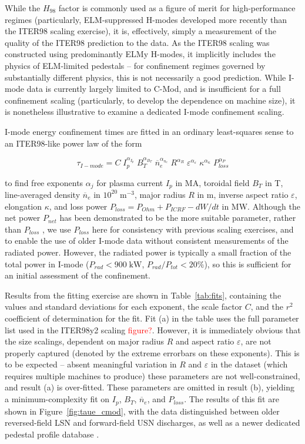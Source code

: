 \documentclass[12pt]{iopart}
\renewcommand{\note}[1]{\textcolor{red}{#1}}
\begin{document}
While the $H_{98}$ factor is commonly used as a figure of merit for high-performance regimes (particularly, ELM-suppressed H-modes developed more recently than the ITER98 scaling exercise), it is, effectively, simply a measurement of the quality of the ITER98 prediction to the data.
As the ITER98 scaling was constructed using predominantly ELMy H-modes, it implicitly includes the physics of ELM-limited pedestals -- for confinement regimes governed by substantially different physics, this is not necessarily a good prediction.
While I-mode data is currently largely limited to C-Mod, and is insufficient for a full confinement scaling (particularly, to develop the dependence on machine size), it is nonetheless illustrative to examine a dedicated I-mode confinement scaling.

I-mode energy confinement times are fitted in an ordinary least-squares sense to an ITER98-like power law of the form

\begin{equation}
 \tau_{I-mode} = C \; I_p^{\alpha_{I_p}} \; B_T^{\alpha_{B_T}} \; \overline{n}_e^{\alpha_{n_e}} \; R^{\alpha_R} \; \varepsilon^{\alpha_\varepsilon} \; \kappa^{\alpha_\kappa} \; P_{loss}^{\alpha_P}
\end{equation}

\noindent to find free exponents $\alpha_j$ for plasma current $I_p$ in MA, toroidal field $B_T$ in T, line-averaged density $\overline{n}_e$ in $10^{20}\;\mbox{m}^{-3}$, major radius $R$ in m, inverse aspect ratio $\varepsilon$, elongation $\kappa$, and loss power $P_{loss} = P_{Ohm} + P_{ICRF} - dW/dt$ in MW.
Although the net power $P_{net}$ has been demonstrated to be the more suitable parameter, rather than $P_{loss}$ \cite{Hughes2002}, we use $P_{loss}$ here for consistency with previous scaling exercises, and to enable the use of older I-mode data without consistent measurements of the radiated power.
However, the radiated power is typically a small fraction of the total power in I-mode ($P_{rad} < 900\;\mbox{kW}$, $P_{rad}/P_{tot} < 20\%$), so this is sufficient for an initial assessment of the confinement.

Results from the fitting exercise are shown in Table~\ref{tab:fits}, containing the values and standard deviations for each exponent, the scale factor $C$, and the $r^2$ coefficient of determination for the fit.
Fit (a) in the table uses the full parameter list used in the ITER98y2 scaling \note{figure?}.
However, it is immediately obvious that the size scalings, dependent on major radius $R$ and aspect ratio $\varepsilon$, are not properly captured (denoted by the extreme errorbars on these exponents).
This is to be expected -- absent meaningful variation in $R$ and $\varepsilon$ in the dataset (which requires multiple machines to produce) these parameters are not well-constrained, and result (a) is over-fitted.
These parameters are omitted in result (b), yielding a minimum-complexity fit on $I_p$, $B_T$, $\overline{n}_e$, and $P_{loss}$.
The results of this fit are shown in Figure~\ref{fig:taue_cmod}, with the data distinguished between older reversed-field LSN and forward-field USN discharges, as well as a newer dedicated pedestal profile database \cite{Walk2014}.
\end{document}
